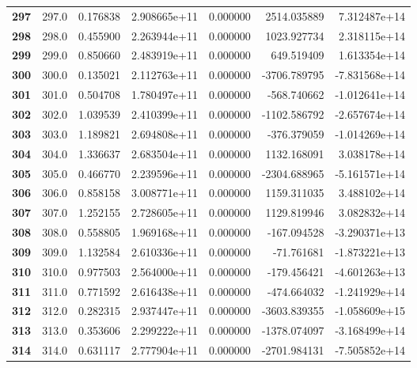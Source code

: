 \documentclass{report}[12pt]
\begin{document}
\begin{center}
\begin{tabular}{lrrrrrr}
\textbf{297 } &          297.0 &   0.176838 &  2.908665e+11 &    0.000000 &  2514.035889 &  7.312487e+14 \\
\textbf{298 } &          298.0 &   0.455900 &  2.263944e+11 &    0.000000 &  1023.927734 &  2.318115e+14 \\
\textbf{299 } &          299.0 &   0.850660 &  2.483919e+11 &    0.000000 &   649.519409 &  1.613354e+14 \\
\textbf{300 } &          300.0 &   0.135021 &  2.112763e+11 &    0.000000 & -3706.789795 & -7.831568e+14 \\
\textbf{301 } &          301.0 &   0.504708 &  1.780497e+11 &    0.000000 &  -568.740662 & -1.012641e+14 \\
\textbf{302 } &          302.0 &   1.039539 &  2.410399e+11 &    0.000000 & -1102.586792 & -2.657674e+14 \\
\textbf{303 } &          303.0 &   1.189821 &  2.694808e+11 &    0.000000 &  -376.379059 & -1.014269e+14 \\
\textbf{304 } &          304.0 &   1.336637 &  2.683504e+11 &    0.000000 &  1132.168091 &  3.038178e+14 \\
\textbf{305 } &          305.0 &   0.466770 &  2.239596e+11 &    0.000000 & -2304.688965 & -5.161571e+14 \\
\textbf{306 } &          306.0 &   0.858158 &  3.008771e+11 &    0.000000 &  1159.311035 &  3.488102e+14 \\
\textbf{307 } &          307.0 &   1.252155 &  2.728605e+11 &    0.000000 &  1129.819946 &  3.082832e+14 \\
\textbf{308 } &          308.0 &   0.558805 &  1.969168e+11 &    0.000000 &  -167.094528 & -3.290371e+13 \\
\textbf{309 } &          309.0 &   1.132584 &  2.610336e+11 &    0.000000 &   -71.761681 & -1.873221e+13 \\
\textbf{310 } &          310.0 &   0.977503 &  2.564000e+11 &    0.000000 &  -179.456421 & -4.601263e+13 \\
\textbf{311 } &          311.0 &   0.771592 &  2.616438e+11 &    0.000000 &  -474.664032 & -1.241929e+14 \\
\textbf{312 } &          312.0 &   0.282315 &  2.937447e+11 &    0.000000 & -3603.839355 & -1.058609e+15 \\
\textbf{313 } &          313.0 &   0.353606 &  2.299222e+11 &    0.000000 & -1378.074097 & -3.168499e+14 \\
\textbf{314 } &          314.0 &   0.631117 &  2.777904e+11 &    0.000000 & -2701.984131 & -7.505852e+14 \\

\end{tabular}
\end{center}
\end{document}
